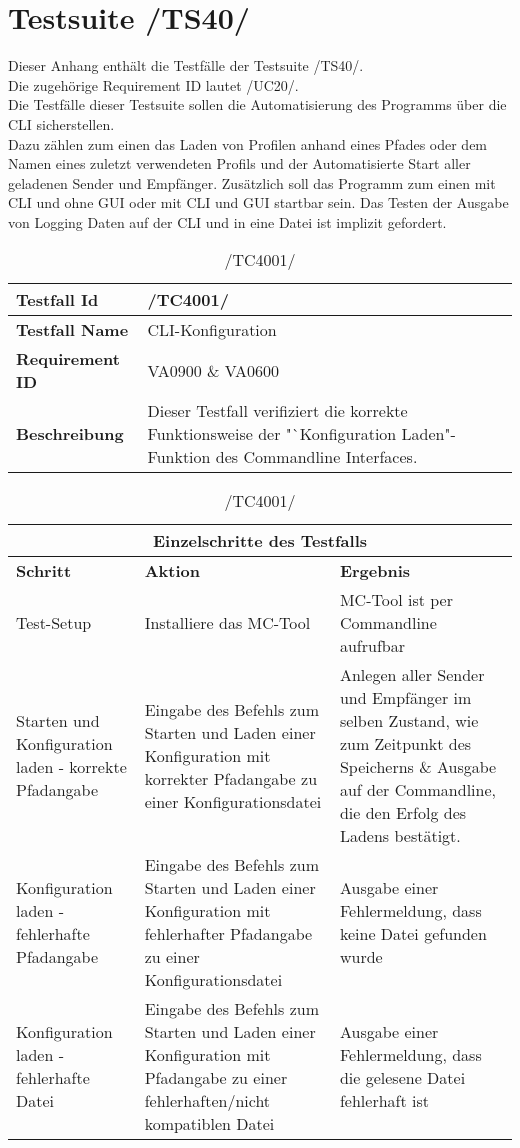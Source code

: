 \chapter{Testsuite /TS40/}
Dieser Anhang enthält die Testfälle der Testsuite /TS40/.\\
Die zugehörige Requirement ID lautet /UC20/.\\
\newline
Die Testfälle dieser Testsuite sollen die Automatisierung des Programms über die CLI sicherstellen.\\
Dazu zählen zum einen das Laden von Profilen anhand eines Pfades oder dem Namen eines zuletzt verwendeten Profils und der Automatisierte Start aller geladenen Sender und Empfänger.
Zusätzlich soll das Programm zum einen mit CLI und ohne GUI oder mit CLI und GUI startbar sein.
Das Testen der Ausgabe von Logging Daten auf der CLI und in eine Datei ist implizit gefordert.

\begin{table}[h]
\caption{/TC4001/}
\label{tab:TC4001}
\begin{center}
\begin{tabular}{|p{3.5cm}|p{9cm}|}
\hline
\textbf{Testfall Id} & /TC4001/\\
\hline
\textbf{Testfall Name} & CLI-Konfiguration\\
\hline
\textbf{Requirement ID} & VA0900 \& VA0600\\
\hline
\textbf{Beschreibung} & Dieser Testfall verifiziert die korrekte
Funktionsweise der "`Konfiguration Laden"-Funktion des Commandline Interfaces.\\
\hline
\end{tabular}
\begin{tabular}{|p{2.5cm}|p{5cm}|p{4.55cm}|}
\multicolumn{3}{|c|}{\textbf{Einzelschritte des Testfalls}} \\
\hline
\textbf{Schritt} & \textbf{Aktion} & \textbf{Ergebnis}\\
\hline
Test-Setup & Installiere das MC-Tool &  MC-Tool ist per
Commandline aufrufbar\\
\hline
Starten und Konfiguration laden - korrekte Pfadangabe & Eingabe des Befehls zum
Starten und Laden einer Konfiguration mit korrekter Pfadangabe zu einer
Konfigurationsdatei & Anlegen aller Sender und Empfänger im selben Zustand, wie
zum Zeitpunkt des Speicherns \& Ausgabe auf der Commandline, die den Erfolg des
Ladens bestätigt.
\\
\hline
Konfiguration laden - fehlerhafte Pfadangabe & Eingabe des Befehls zum
Starten und Laden einer Konfiguration mit fehlerhafter Pfadangabe zu einer
Konfigurationsdatei & Ausgabe einer Fehlermeldung, dass keine Datei gefunden wurde\\
\hline
Konfiguration laden - fehlerhafte Datei & Eingabe des Befehls zum Starten
und Laden einer Konfiguration mit Pfadangabe zu einer fehlerhaften/nicht
kompatiblen Datei & Ausgabe einer Fehlermeldung, dass die gelesene Datei fehlerhaft ist\\
\hline
\end{tabular}
\end{center}
\label{default}
\end{table}

